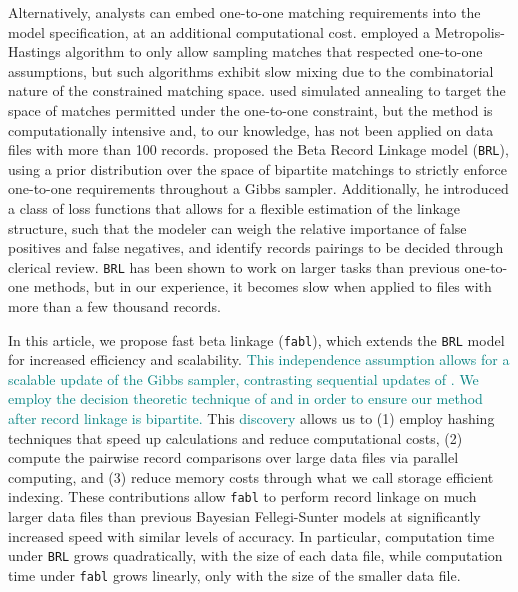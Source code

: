 \documentclass[ba]{imsart}
\begin{document}
Alternatively, analysts can embed one-to-one matching requirements into the model specification, at an additional computational cost. \cite{Larsen05} employed a Metropolis-Hastings algorithm to only allow sampling matches that respected one-to-one assumptions, but such algorithms exhibit slow mixing due to the combinatorial nature of the constrained matching space. \cite{fortunato_2010} used simulated annealing to target the space of matches permitted under the one-to-one constraint, but the method is computationally intensive and, to our knowledge, has not been applied on data files with more than 100 records. \cite{sadinle_bayesian_2017} proposed the Beta Record Linkage model (\texttt{BRL}), using a prior distribution over the space of bipartite matchings to strictly enforce one-to-one requirements throughout a Gibbs sampler. Additionally, he introduced a class of loss functions that allows for a flexible estimation of the linkage structure, such that the modeler can weigh the relative importance of false positives and false negatives, and identify records pairings to be decided through clerical review. \texttt{BRL} has been shown to work on larger tasks than previous one-to-one methods, but in our experience, it becomes slow when applied to files with more than a few thousand records. 

In this article, we propose fast beta linkage (\texttt{fabl}), which extends the \texttt{BRL} model for increased efficiency and scalability. {} \textcolor{teal}{This independence assumption allows for a scalable update of the Gibbs sampler, contrasting sequential updates of \cite{sadinle_bayesian_2017}. We employ the decision theoretic technique of \cite{sadinle_bayesian_2017} and \cite{steorts_bayesian_2016} in order to ensure our method after record linkage is bipartite.}
This \textcolor{teal}{discovery} allows us to (1) employ hashing techniques that speed up calculations and reduce computational costs, (2) compute the pairwise record comparisons over large data files via parallel computing, and (3) reduce memory costs through what we call storage efficient indexing. These contributions allow \texttt{fabl} to perform record linkage on much larger data files than previous Bayesian Fellegi-Sunter models at significantly increased speed with similar levels of accuracy. In particular, computation time under \texttt{BRL} grows quadratically, with the size of each data file, while computation time under \texttt{fabl} grows linearly, only with the size of the smaller data file.
\end{document}
